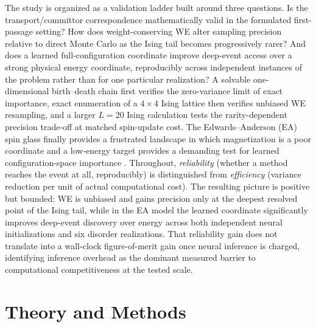 \documentclass[a4paper,fleqn]{cas-sc}
\begin{document}
The study is organized as a validation ladder built around three questions. Is the
transport/committor correspondence mathematically valid in the formulated first-passage
setting? How does weight-conserving WE alter sampling precision relative to direct Monte Carlo
as the Ising tail becomes progressively rarer? And does a learned full-configuration coordinate
improve deep-event access over a strong physical energy coordinate, reproducibly across
independent instances of the problem rather than for one particular realization? A solvable
one-dimensional birth--death chain first verifies the zero-variance limit of exact importance,
exact enumeration of a $4\times4$ Ising lattice then verifies unbiased WE resampling, and a
larger $L=20$ Ising calculation tests the rarity-dependent precision trade-off at matched
spin-update cost. The Edwards--Anderson (EA) spin glass finally provides a frustrated landscape
in which magnetization is a poor coordinate and a low-energy target provides a demanding test
for learned configuration-space importance \citep{ising1925,onsager1944,edwards1975,binder1986}.
Throughout, \emph{reliability} (whether a method reaches the event at all, reproducibly) is
distinguished from \emph{efficiency} (variance reduction per unit of actual computational
cost). The resulting picture is positive but bounded: WE is unbiased and gains precision only
at the deepest resolved point of the Ising tail, while in the EA model the learned coordinate
significantly improves deep-event discovery over energy across both independent neural
initializations and six disorder realizations. That reliability gain does not translate into a
wall-clock figure-of-merit gain once neural inference is charged, identifying inference overhead
as the dominant measured barrier to computational competitiveness at the tested scale.

\FloatBarrier

\section{Theory and Methods}\label{sec:methods}
\end{document}
